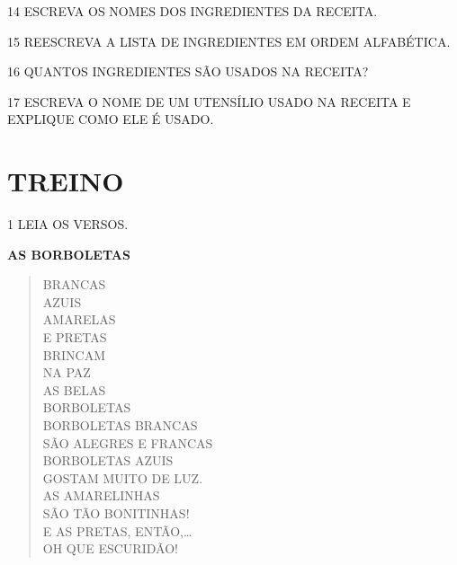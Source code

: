 \num{14} ESCREVA OS NOMES DOS INGREDIENTES DA RECEITA.


\num{15} REESCREVA A LISTA DE INGREDIENTES EM ORDEM ALFABÉTICA.


\num{16} QUANTOS INGREDIENTES SÃO USADOS NA RECEITA?


\num{17} ESCREVA O NOME DE UM UTENSÍLIO USADO NA RECEITA E EXPLIQUE COMO ELE É USADO.










\section*{TREINO}


\num{1} LEIA OS VERSOS.

\begin{myquote}
\textbf{AS BORBOLETAS}

\begin{verse}
BRANCAS\\
AZUIS\\
AMARELAS\\
E PRETAS\\
BRINCAM\\
NA PAZ\\
AS BELAS\\
BORBOLETAS\\
BORBOLETAS BRANCAS\\
SÃO ALEGRES E FRANCAS\\
BORBOLETAS AZUIS\\
GOSTAM MUITO DE LUZ.\\
AS AMARELINHAS\\
SÃO TÃO BONITINHAS!\\
E AS PRETAS, ENTÃO,\ldots{}\\
OH QUE ESCURIDÃO!
\end{verse}

\end{myquote}

